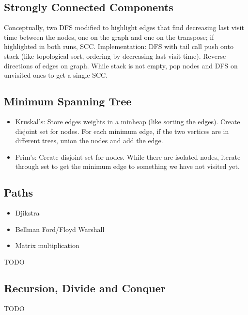 \documentclass[10pt]{article}
\begin{document}
\subsection{Strongly Connected Components}
Conceptually, two DFS modified to highlight edges that find decreasing last visit time between the nodes, one on the graph and one on the transpose; if highlighted in both runs, SCC. Implementation: DFS with tail call push onto stack (like topological sort, ordering by decreasing last visit time). Reverse directions of edges on graph. While stack is not empty, pop nodes and DFS on unvisited ones to get a single SCC. 
\subsection{Minimum Spanning Tree}
\begin{itemize}
    \itemsep0em
    \item Kruskal's: Store edges weights in a minheap (like sorting the edges). Create disjoint set for nodes. For each minimum edge, if the two vertices are in different trees, union the nodes and add the edge.
    \item Prim's: Create disjoint set for nodes. While there are isolated nodes, iterate through set to get the minimum edge to something we have not visited yet.
\end{itemize}
\subsection{Paths}
\begin{itemize}
    \itemsep0em
    \item Djikstra
    \item Bellman Ford/Floyd Warshall
    \item Matrix multiplication
\end{itemize}
TODO

\subsection{Recursion, Divide and Conquer}
TODO
\end{document}
